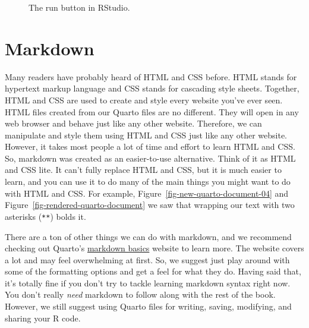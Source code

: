 \documentclass[
  letterpaper,
  DIV=11,
  numbers=noendperiod]{scrreprt}
\begin{document}
\begin{figure}


\caption{\label{fig-quarto-run-code-chunks}The run button in RStudio.}

\end{figure}%

\section{Markdown}\label{markdown}

Many readers have probably heard of HTML and CSS before. HTML stands for
hypertext markup language and CSS stands for cascading style sheets.
Together, HTML and CSS are used to create and style every website you've
ever seen. HTML files created from our Quarto files are no different.
They will open in any web browser and behave just like any other
website. Therefore, we can manipulate and style them using HTML and CSS
just like any other website. However, it takes most people a lot of time
and effort to learn HTML and CSS. So, markdown was created as an
easier-to-use alternative. Think of it as HTML and CSS lite. It can't
fully replace HTML and CSS, but it is much easier to learn, and you can
use it to do many of the main things you might want to do with HTML and
CSS. For example, Figure~\ref{fig-new-quarto-document-04} and
Figure~\ref{fig-rendered-quarto-document} we saw that wrapping our text
with two asterisks (\texttt{**}) bolds it.

There are a ton of other things we can do with markdown, and we
recommend checking out Quarto's
\href{https://quarto.org/docs/authoring/markdown-basics.html}{markdown
basics} website to learn more. The website covers a lot and may feel
overwhelming at first. So, we suggest just play around with some of the
formatting options and get a feel for what they do. Having said that,
it's totally fine if you don't try to tackle learning markdown syntax
right now. You don't really \emph{need} markdown to follow along with
the rest of the book. However, we still suggest using Quarto files for
writing, saving, modifying, and sharing your R code.
\end{document}
